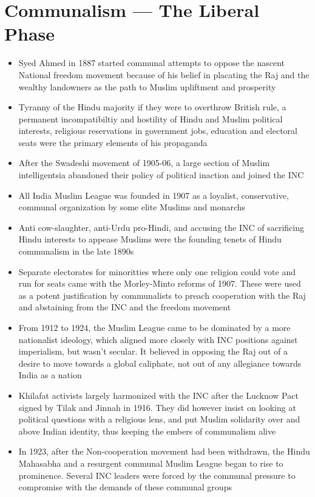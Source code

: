 \section{Communalism — The Liberal Phase}
\begin{itemize}
    \item Syed Ahmed in 1887 started communal attempts to oppose the nascent National freedom movement because of his belief in placating the Raj and the wealthy landowners as the path to Muslim upliftment and prosperity
    \item Tyranny of the Hindu majority if they were to overthrow British rule, a permanent incompatibiltiy and hostility of Hindu and Muslim political interests, religious reservations in government jobs, education and electoral seats were the primary elements of his propaganda
    \item After the Swadeshi movement of 1905-06, a large section of Muslim intelligentsia abandoned their policy of political inaction and joined the INC
    \item All India Muslim League was founded in 1907 as a loyalist, conservative, communal organization by some elite Muslims and monarchs
    \item Anti cow-slaughter, anti-Urdu pro-Hindi, and accusing the INC of sacrificing Hindu interests to appease Muslims were the founding tenets of Hindu communalism in the late 1890s
    \item Separate electorates for minoritties where only one religion could vote and run for seats came with the Morley-Minto reforms of 1907. These were used as a potent justification by communalists to preach cooperation with the Raj and abstaining from the INC and the freedom movement
    \item From 1912 to 1924, the Muslim League came to be dominated by a more nationalist ideology, which aligned more closely with INC positions against imperialism, but wasn't secular. It believed in opposing the Raj out of a desire to move towards a global \Gls{caliphate}, not out of any allegiance towards India as a nation
    \item Khilafat activists largely harmonized with the INC after the Lucknow Pact signed by Tilak and Jinnah in 1916. They did however insist on looking at political questions with a religious lens, and put Muslim solidarity over and above Indian identity, thus keeping the embers of communalism alive
    \item In 1923, after the Non-cooperation movement had been withdrawn, the Hindu Mahasabha and a resurgent communal Muslim League began to rise to prominence. Several INC leaders were forced by the communal pressure to compromise with the demands of these communal groups

\end{itemize}
